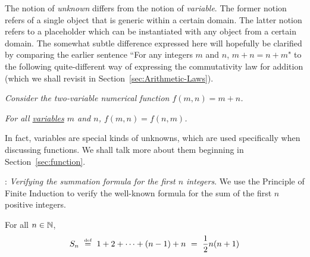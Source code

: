 \bigskip

The notion of {\it unknown} differs from the notion of {\it variable}.  The former notion refers of a single object that is generic within a certain domain.  The latter notion refers to a placeholder which can be instantiated with any object from a certain domain.  The somewhat subtle difference expressed here will hopefully be clarified by comparing the earlier sentence ``For any integers $m$ and $n$, $m + n = n + m$" to the following quite-different way of expressing the commutativity law for addition (which we shall revisit in Section~\ref{sec:Arithmetic-Laws}).

\smallskip

{\em Consider the two-variable numerical function $f(m, n) = m+n$.}

{\em  For all \underline{variables} $m$ and $n$, $f(m,n) = f(n,m)$.}

In fact, variables are special kinds of unknowns, which are used specifically when discussing functions.  We shall talk more about them beginning in Section~\ref{sec:function}.

\bigskip

:  {\it Verifying the summation formula for the first $n$ integers}.
We use the Principle of Finite Induction to verify the well-known formula for the sum of the first $n$ positive integers.

 
\begin{prop}
\label{thm:sum-1-to-n-induction1}
For all $n \in \mathbb{N}$,
\begin{equation}
\label{eq:sum-first-n1}
S_n \ \stackrel{\mbox{{\tiny def}}}{=} \ 1 + 2 + \cdots + (n-1) + n
        \ = \ {1 \over 2} n (n+1)
\end{equation}
\end{prop}

\bigskip

\noindent {}

